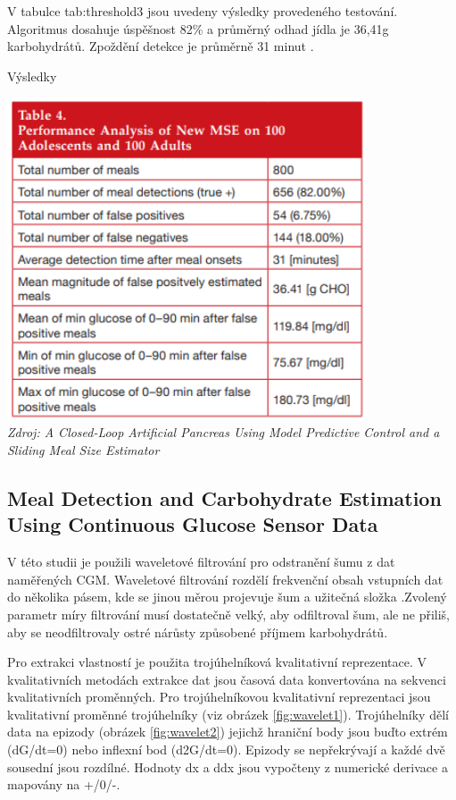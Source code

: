 V tabulce {tab:threshold3} jsou uvedeny výsledky provedeného testování. Algoritmus dosahuje úspěšnost 82\% a průměrný odhad jídla je 36,41g karbohydrátů. Zpoždění detekce je průměrně 31 minut \citep{Analyza.Thresholds}.

\begin{table}[H]
\caption{Výsledky}
\label{tab:threshold3}
\centering
\includegraphics[width=0.8\textwidth]{img/analyza/threshold3.png}\\
\textit{Zdroj: A Closed-Loop Artificial Pancreas Using Model Predictive Control and a Sliding Meal Size Estimator \citep{Analyza.Thresholds}}
\end{table}


\subsection{Meal Detection and Carbohydrate Estimation Using Continuous Glucose Sensor Data}
\label{ch:wavelet}

V této studii \citet{Analyza.WaveletEst} je použili waveletové filtrování pro odstranění šumu z dat naměřených CGM. Waveletové filtrování rozdělí frekvenční obsah vstupních dat do několika pásem, kde se jinou měrou projevuje šum a užitečná složka \citep{Analyza.Wavelet}.Zvolený parametr míry filtrování musí dostatečně velký, aby odfiltroval šum, ale ne přiliš, aby se neodfiltrovaly ostré nárůsty způsobené příjmem karbohydrátů.

Pro extrakci vlastností je použita trojúhelníková kvalitativní reprezentace. V kvalitativních metodách extrakce dat jsou časová data konvertována na sekvenci kvalitativních proměnných. Pro trojúhelníkovou kvalitativní reprezentaci jsou kvalitativní proměnné trojúhelníky (viz obrázek \ref{fig:wavelet1}). Trojúhelníky dělí data na epizody (obrázek \ref{fig:wavelet2}) jejichž hraniční body jsou buďto extrém (dG/dt=0) nebo inflexní bod (d2G/dt=0). Epizody se nepřekrývají a každé dvě sousední jsou rozdílné. Hodnoty dx a ddx jsou vypočteny z numerické derivace a mapovány na +/0/-.


